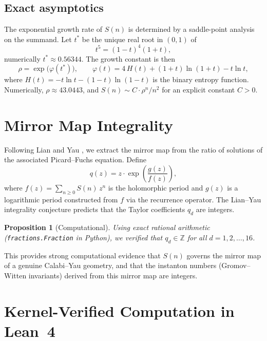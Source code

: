 \documentclass[11pt, a4paper]{article}
\newtheorem{proposition}[theorem]{Proposition}
\begin{document}
\subsection*{Exact asymptotics}
The exponential growth rate of $S(n)$ is determined by a saddle-point analysis on the summand. Let $t^*$ be the unique real root in $(0,1)$ of
\begin{equation}\label{eq:saddle}
  t^5 = (1-t)^4(1+t),
\end{equation}
numerically $t^* \approx 0.56344$. The growth constant is then
\begin{equation}\label{eq:growth}
  \rho = \exp\!\bigl(\varphi(t^*)\bigr), \qquad \varphi(t) = 4\,H(t) + (1+t)\ln(1+t) - t\ln t,
\end{equation}
where $H(t) = -t\ln t - (1-t)\ln(1-t)$ is the binary entropy function. Numerically, $\rho \approx 43.0443$, and $S(n) \sim C \cdot \rho^n / n^2$ for an explicit constant $C > 0$.


\section{Mirror Map Integrality}\label{sec:mirrormap}

Following Lian and Yau \cite{LianYau1996}, we extract the mirror map from the ratio of solutions of the associated Picard--Fuchs equation. Define
\[
  q(z) = z \cdot \exp\!\left(\frac{g(z)}{f(z)}\right),
\]
where $f(z) = \sum_{n \ge 0} S(n)\,z^n$ is the holomorphic period and $g(z)$ is a logarithmic period constructed from $f$ via the recurrence operator. The Lian--Yau integrality conjecture predicts that the Taylor coefficients $q_d$ are integers.

\begin{proposition}[Computational]\label{prop:integrality}
Using exact rational arithmetic (\texttt{fractions.Fraction} in Python), we verified that $q_d \in \mathbb{Z}$ for all $d = 1, 2, \dots, 16$.
\end{proposition}

This provides strong computational evidence that $S(n)$ governs the mirror map of a genuine Calabi--Yau geometry, and that the instanton numbers (Gromov--Witten invariants) derived from this mirror map are integers.


\section{Kernel-Verified Computation in Lean~4}\label{sec:lean4}
\end{document}
